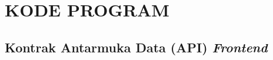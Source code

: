 \cleardoublepage
\chapter{KODE PROGRAM}

\section{Kontrak Antarmuka Data (API) \textit{Frontend}}






